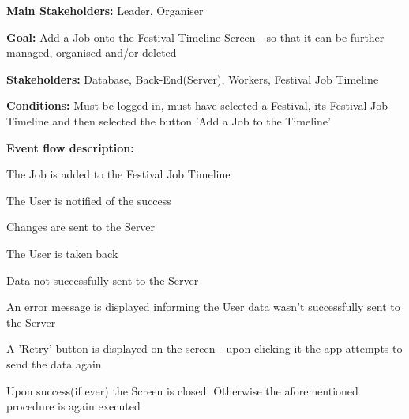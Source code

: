 			\noindent {}
			\begin{packed_item}
				\item \textbf{Main Stakeholders:} Leader, Organiser
				\item \textbf{Goal:} Add a Job onto the Festival Timeline Screen - so that it can be further managed, organised and/or deleted
				\item \textbf{Stakeholders: } Database, Back-End(Server), Workers, Festival Job Timeline
				\item \textbf{Conditions: } Must be logged in, must have selected a Festival, its Festival Job Timeline and then selected the button 'Add a Job to the Timeline'
				\item \textbf{Event flow description: }
				\begin{packed_enum}
					\item The Job is added to the Festival Job Timeline
					\item The User is notified of the success
					\item Changes are sent to the Server
					\item The User is taken back
				\end{packed_enum}
				
				\begin{packed_item}
					\item[3.a] Data not successfully sent to the Server
					\item[] \begin{packed_enum}
						\item An error message is displayed informing the User data wasn't successfully sent to the Server
						\item A 'Retry' button is displayed on the screen - upon clicking it the app attempts to send the data again
						\item Upon success(if ever) the Screen is closed. Otherwise the aforementioned procedure is again executed
					\end{packed_enum}
				\end{packed_item}
			\end{packed_item}
			

